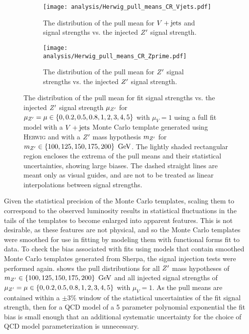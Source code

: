 \begin{figure}[htbp]
 \centering
 \begin{subfigure}[t]{0.48\textwidth}
  \centering
  \texttt{[image: analysis/Herwig\_pull\_means\_CR\_Vjets.pdf]}
  \caption[The distribution of the pull mean for $\Vjets$ and signal strengths vs. the injected $\Zprime$ signal strength.]{%
   The distribution of the pull mean for $\Vjets$ and signal strengths vs. the injected $\Zprime$ signal strength.}
  \label{fig:pulls_Vjets_Herwig}
 \end{subfigure}%
 \quad
 \begin{subfigure}[t]{0.48\textwidth}
  \centering
  \texttt{[image: analysis/Herwig\_pull\_means\_CR\_Zprime.pdf]}
  \caption[The distribution of the pull mean for $\Zprime$ signal strengths vs. the injected $\Zprime$ signal strength.]{%
   The distribution of the pull mean for $\Zprime$ signal strengths vs. the injected $\Zprime$ signal strength.}
  \label{fig:pulls_Zprime_Herwig}
 \end{subfigure}
 \caption[The distribution of the pull mean for fit signal strengths vs. the injected $\Zprime$ signal strength with \textsc{Herwig} Monte Carlo templates.]{%
  The distribution of the pull mean for fit signal strengths vs. the injected $\Zprime$ signal strength $\mu_{Z'}$ for $\mu_{Z'} = \mu \in \left\{0, 0.2, 0.5, 0.8, 1, 2, 3, 4, 5\right\}$ with $\mu_{V} = 1$ using a full fit model with a $\Vjets$ Monte Carlo template generated using \textsc{Herwig} and with a $\Zprime$ mass hypothesis $m_{Z'}$ for
  $m_{Z'} \in \left\{100, 125, 150, 175, 200\right\}~\mathrm{GeV}$.
  The lightly shaded rectangular region encloses the extrema of the pull means and their statistical uncertainties, showing large biases.
  The dashed straight lines are meant only as visual guides, and are not to be treated as linear interpolations between signal strengths.}
 \label{fig:pulls_summary_Herwig}
\end{figure}

Given the statistical precision of the Monte Carlo templates, scaling them to correspond to the observed luminosity results in statistical fluctuations in the tails of the templates to become enlarged into apparent features.
This is not desirable, as these features are not physical, and so the Monte Carlo templates were smoothed for use in fitting by modeling them with functional forms fit to data.
To check the bias associated with fits using models that contain smoothed Monte Carlo templates generated from Sherpa, the signal injection tests were performed again.
 shows the pull distributions for all $\Zprime$ mass hypotheses of $m_{Z'} \in \left\{100, 125, 150, 175, 200\right\}~\mathrm{GeV}$ and all injected signal strengths of $\mu_{Z'} = \mu \in \left\{0, 0.2, 0.5, 0.8, 1, 2, 3, 4, 5\right\}$ with $\mu_{V} = 1$.
As the pull means are contained within a $\pm 3\%$ window of the statistical uncertainties of the fit signal strength, then for a QCD model of a 5 parameter polynomial exponential the fit bias is small enough that an additional systematic uncertainty for the choice of QCD model parameterization is unnecessary.

